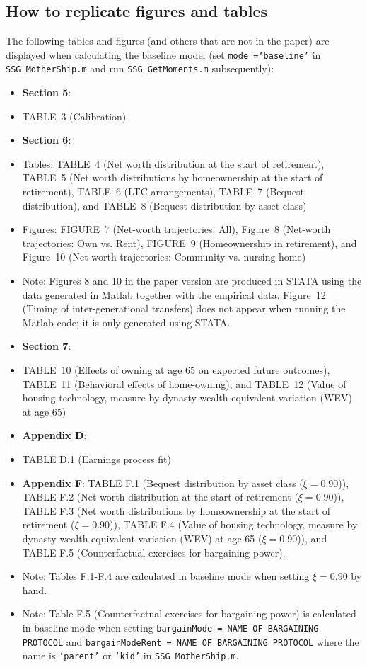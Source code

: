\documentclass[a4,12p]{article}
\begin{document}
\subsection{How to replicate figures and tables}
\label{sec:quant-fig-tab}
The following tables and figures (and others that are not in the paper) are displayed when calculating the baseline model (set \texttt{mode =`baseline'} in \texttt{SSG\_MotherShip.m} and run \texttt{SSG\_GetMoments.m} subsequently): 
\begin{itemize}
	\item \textbf{Section 5}: 
	\item[] TABLE~3 (Calibration) 
	\item \textbf{Section 6}: 
	\item[] Tables: TABLE~4 (Net worth distribution at the start of retirement), TABLE~5 (Net worth distributions by homeownership at the start of retirement), TABLE~6 (LTC arrangements), TABLE~7 (Bequest distribution), and TABLE~8 (Bequest distribution by asset class)
	\item[] Figures: FIGURE~7 (Net-worth trajectories: All), Figure~8 (Net-worth trajectories: Own vs. Rent), FIGURE~9 (Homeownership in retirement), and Figure~10 (Net-worth trajectories: Community vs. nursing home)
	\item Note: Figures 8 and 10 in the paper version are produced in STATA using the data generated in Matlab together with the empirical data. Figure~12 (Timing of inter-generational transfers) does not appear when running the Matlab code; it is only generated using STATA. 
	\item \textbf{Section 7}: 
	\item[] TABLE~10 (Effects of owning at age 65 on expected future outcomes),
	TABLE~11 (Behavioral effects of home-owning), and TABLE~12 (Value of housing technology, measure by dynasty wealth equivalent variation (WEV) at age 65)
	\item \textbf{Appendix D}:
	\item[] TABLE D.1 (Earnings process fit) 
	\item \textbf{Appendix F}: TABLE F.1 (Bequest distribution by asset class ($\xi=0.90$)), TABLE F.2 (Net worth distribution at the start of retirement ($\xi=0.90$)), TABLE F.3 (Net worth distributions by homeownership at the start of retirement ($\xi=0.90$)), TABLE F.4 (Value of housing technology, measure by dynasty wealth equivalent variation (WEV) at age 65 ($\xi=0.90$)), and TABLE F.5 (Counterfactual exercises for bargaining power).
	\item[] Note: Tables F.1-F.4 are calculated in baseline mode when setting $\xi=0.90$ by hand. 
	\item[] Note: Table F.5 (Counterfactual exercises for bargaining power) is calculated in baseline mode when setting \texttt{bargainMode = NAME OF BARGAINING PROTOCOL} and \texttt{bargainModeRent = NAME OF BARGAINING PROTOCOL} where the name is  \texttt{`parent'} or \texttt{`kid'} in \texttt{SSG\_MotherShip.m}.

\end{itemize}
\end{document}
